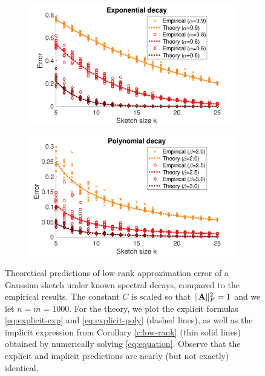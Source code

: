 \documentclass[thesis.tex]{subfiles}
\begin{document}
\begin{figure}[t]
\centering
    \begin{subfigure}{0.49\textwidth}%
    \includegraphics[width=\textwidth]{explicit_exp}
    \end{subfigure}
\hfill
    \begin{subfigure}{0.49\textwidth}%
      \includegraphics[width=\textwidth]{explicit_poly}
    \end{subfigure}
\caption{
Theoretical predictions of low-rank approximation error of a Gaussian
sketch under known spectral decays, compared to the empirical results.
The constant $C$ is scaled so that $\|\mathbf A\|_F^2=1$ and we let
$n=m=1000$. For the theory, we plot the explicit formulas
\eqref{eq:explicit-exp} and \eqref{eq:explicit-poly} (dashed lines),
as well as the implicit expression from Corollary \ref{c:low-rank}
(thin solid lines) obtained by numerically solving
\eqref{eq:equation}. Observe that the explicit and implicit
predictions are nearly (but not exactly) identical.
}
\label{f:explicit}
\end{figure}
\end{document}
